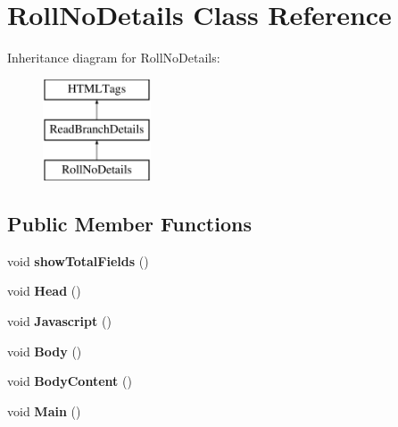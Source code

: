 \hypertarget{classRollNoDetails}{\section{Roll\-No\-Details Class Reference}
\label{classRollNoDetails}
}
Inheritance diagram for Roll\-No\-Details\-:\begin{figure}[H]
\begin{center}
\leavevmode
\includegraphics[height=3.000000cm]{classRollNoDetails}
\end{center}
\end{figure}
\subsection*{Public Member Functions}
\begin{DoxyCompactItemize}
\item 
\hypertarget{classRollNoDetails_a1a73466ff174536c74ac9bcace561c83}{void {\bfseries show\-Total\-Fields} ()}\label{classRollNoDetails_a1a73466ff174536c74ac9bcace561c83}

\item 
\hypertarget{classRollNoDetails_ad3fa3bfcba84e65264f12627095da3d6}{void {\bfseries Head} ()}\label{classRollNoDetails_ad3fa3bfcba84e65264f12627095da3d6}

\item 
\hypertarget{classRollNoDetails_a2f81605e7a0fc1305b0c568bf1d26b8c}{void {\bfseries Javascript} ()}\label{classRollNoDetails_a2f81605e7a0fc1305b0c568bf1d26b8c}

\item 
\hypertarget{classRollNoDetails_aeadbb26bf6e93895d69af83ec4bb40a0}{void {\bfseries Body} ()}\label{classRollNoDetails_aeadbb26bf6e93895d69af83ec4bb40a0}

\item 
\hypertarget{classRollNoDetails_a22c4dd142eebe3cfaf220b6080257082}{void {\bfseries Body\-Content} ()}\label{classRollNoDetails_a22c4dd142eebe3cfaf220b6080257082}

\item 
\hypertarget{classRollNoDetails_aef87b13056bb753c31e43021df9764c4}{void {\bfseries Main} ()}\label{classRollNoDetails_aef87b13056bb753c31e43021df9764c4}

\end{DoxyCompactItemize}
